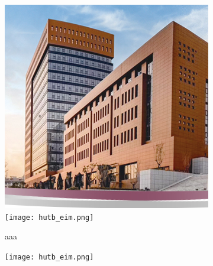 \begin{figure}[!htb]
    \centering
    \begin{subfigure}[t]{0.13\linewidth}
        \captionsetup{justification=centering} 
        \begin{minipage}[b]{1\linewidth}
        \includegraphics[width=1\linewidth]{hutb_building.png} 
        \vspace{-1ex} \vfill
        \texttt{[image: hutb\_eim.png]}
        \caption{aaa}
        \end{minipage}
    \end{subfigure}
    \begin{subfigure}[t]{0.13\linewidth}
        \captionsetup{justification=centering} 
        \begin{minipage}[b]{1\linewidth}
        \texttt{[image: hutb\_eim.png]} 
        \vspace{-1ex} \vfill

\end{minipage}
\end{subfigure}
\end{figure}
